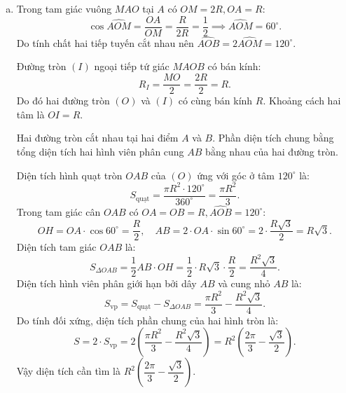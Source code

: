 \begin{bt}
{\begin{enumerate}[a)]
			Mặt khác, $\widehat{ABC} = 90^\circ$ (góc nội tiếp chắn nửa đường tròn đường kính $AC$), suy ra $BC \perp AB$.
			
			Do đó $OM \parallel BC$ (vì cùng vuông góc với $AB$).
			
			Vì $H$ là trung điểm của $AB$ nên $AB = 2AH$.
			
			Vì $AC$ là đường kính nên $AC = 2AO$.
			
			Xét $\Delta MAO$ và $\Delta AHO$ có:
			$$\widehat{AOM}\text{ chung},\quad \widehat{MAO} = \widehat{AHO} = 90^\circ.$$
			Do đó $\Delta MAO \backsim \Delta AHO\text{ (g-g)}$, suy ra:
			$$\dfrac{MA}{AH} = \dfrac{MO}{AO} \implies MA \cdot AO = MO \cdot AH \implies MA \cdot (2AO) = MO \cdot (2AH) \implies AM \cdot AC = OM \cdot AB.$$
			\item Trong tam giác vuông $MAO$ tại $A$ có $OM = 2R, OA = R$:
			$$\cos\widehat{AOM} = \dfrac{OA}{OM} = \dfrac{R}{2R} = \dfrac{1}{2} \implies \widehat{AOM} = 60^\circ.$$
			Do tính chất hai tiếp tuyến cắt nhau nên $\widehat{AOB} = 2\widehat{AOM} = 120^\circ$.
			
			Đường tròn $(I)$ ngoại tiếp tứ giác $MAOB$ có bán kính:
			$$R_I = \dfrac{MO}{2} = \dfrac{2R}{2} = R.$$
			Do đó hai đường tròn $(O)$ và $(I)$ có cùng bán kính $R$. Khoảng cách hai tâm là $OI = R$.
			
			Hai đường tròn cắt nhau tại hai điểm $A$ và $B$. Phần diện tích chung bằng tổng diện tích hai hình viên phân cung $AB$ bằng nhau của hai đường tròn.
			
			Diện tích hình quạt tròn $OAB$ của $(O)$ ứng với góc ở tâm $120^\circ$ là:
			$$S_{\text{quạt}} = \dfrac{\pi R^2 \cdot 120^\circ}{360^\circ} = \dfrac{\pi R^2}{3}.$$
			Trong tam giác cân $OAB$ có $OA = OB = R, \widehat{AOB} = 120^\circ$:
			$$OH = OA \cdot \cos 60^\circ = \dfrac{R}{2},\quad AB = 2 \cdot OA \cdot \sin 60^\circ = 2 \cdot \dfrac{R\sqrt{3}}{2} = R\sqrt{3}.$$
			Diện tích tam giác $OAB$ là:
			$$S_{\Delta OAB} = \dfrac{1}{2} AB \cdot OH = \dfrac{1}{2} \cdot R\sqrt{3} \cdot \dfrac{R}{2} = \dfrac{R^2\sqrt{3}}{4}.$$
			Diện tích hình viên phân giới hạn bởi dây $AB$ và cung nhỏ $AB$ là:
			$$S_{\text{vp}} = S_{\text{quạt}} - S_{\Delta OAB} = \dfrac{\pi R^2}{3} - \dfrac{R^2\sqrt{3}}{4}.$$
			Do tính đối xứng, diện tích phần chung của hai hình tròn là:
			$$S = 2 \cdot S_{\text{vp}} = 2\left(\dfrac{\pi R^2}{3} - \dfrac{R^2\sqrt{3}}{4}\right) = R^2\left(\dfrac{2\pi}{3} - \dfrac{\sqrt{3}}{2}\right).$$
			Vậy diện tích cần tìm là $R^2\left(\dfrac{2\pi}{3} - \dfrac{\sqrt{3}}{2}\right)$.
		\end{enumerate}
	}
\end{bt}
